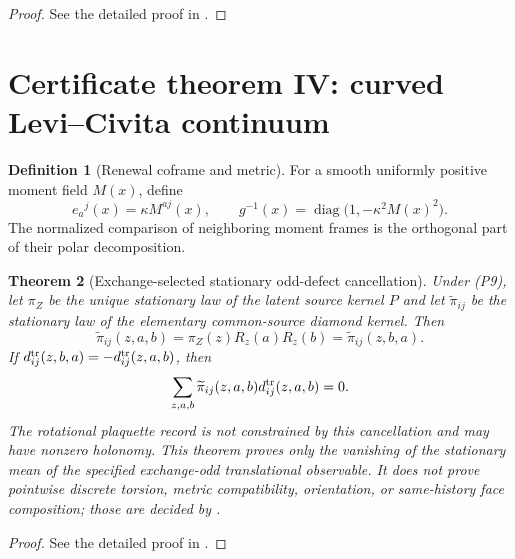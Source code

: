 \documentclass[11pt]{article}
\newtheorem{theorem}{Theorem}[section]
\theoremstyle{definition}
\newtheorem{definition}[theorem]{Definition}
\theoremstyle{remark}
\newcommand{\diag}{\operatorname{diag}}
\begin{document}
\begin{proof}
See the detailed proof in .
\end{proof}

\section{Certificate theorem IV: curved Levi--Civita continuum}

\begin{definition}[Renewal coframe and metric]
For a smooth uniformly positive moment field $M(x)$, define
\[
  e_a{}^j(x)=\kappa M^{aj}(x),
  \qquad
  g^{-1}(x)=\diag\bigl(1,-\kappa^2M(x)^2\bigr).
\]
The normalized comparison of neighboring moment frames is the orthogonal part
of their polar decomposition.
\end{definition}

\begin{theorem}[Exchange-selected stationary odd-defect cancellation]
\label{thm:torsion-cancellation}
Under \textup{(P9)}, let $\pi_Z$ be the unique
stationary law of the latent source kernel $P$ and let $\widetilde\pi_{ij}$ be
the stationary law of the elementary common-source diamond kernel.  Then
\[
 \widetilde\pi_{ij}(z,a,b)
 =\pi_Z(z)R_z(a)R_z(b)
 =\widetilde\pi_{ij}(z,b,a).
\]
If $d^{\rm tr}_{ij}(z,b,a)=-d^{\rm tr}_{ij}(z,a,b)$, then
\[
  \sum_{z,a,b}\widetilde\pi_{ij}(z,a,b)
  d^{\rm tr}_{ij}(z,a,b)=0.
\]
The rotational plaquette record is not constrained by this cancellation and
may have nonzero holonomy.  This theorem proves only the vanishing of the
stationary mean of the specified exchange-odd translational observable.  It
does not prove pointwise discrete torsion, metric compatibility, orientation,
or same-history face composition; those are decided by
.
\end{theorem}

\begin{proof}
See the detailed proof in .
\end{proof}
\end{document}
